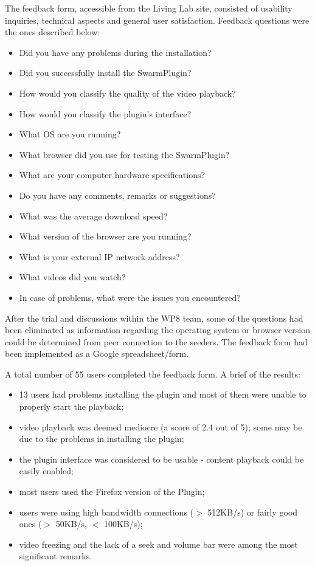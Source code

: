 The feedback form, accessible from the Living Lab site, consisted of usability
inquiries, technical aspects and general user satisfaction. Feedback questions
were the ones described below:
\begin{itemize}
  \item Did you have any problems during the installation?
  \item Did you successfully install the SwarmPlugin?
  \item How would you classify the quality of the video playback?
  \item How would you classify the plugin's interface?
  \item What OS are you running?
  \item What browser did you use for testing the SwarmPlugin?
  \item What are your computer hardware specifications?
  \item Do you have any comments, remarks or suggestions?
  \item What was the average download speed?
  \item What version of the browser are you running?
  \item What is your external IP network address?
  \item What videos did you watch?
  \item In case of problems, what were the issues you encountered?
\end{itemize}

After the trial and discussions within the WP8 team, some of the questions had
been eliminated as information regarding the operating system or browser
version could be determined from peer connection to the seeders. The feedback
form had been implemented as a Google spreadsheet/form.

A total number of 55 users completed the feedback form. A brief of the
results:
\begin{itemize}
  \item 13 users had problems installing the plugin and most of them were
  unable to properly start the playback;
  \item video playback was deemed mediocre (a score of 2.4 out of 5); some may
  be due to the problems in installing the plugin;
  \item the plugin interface was considered to be usable - content playback
  could be easily enabled;
  \item most users used the Firefox version of the Plugin;
  \item users were using high bandwidth connections ($>$ 512KB/s) or fairly
  good ones ($>$ 50KB/s, $<$ 100KB/s);
  \item video freezing and the lack of a seek and volume bar were among the
  most significant remarks.
\end{itemize}

